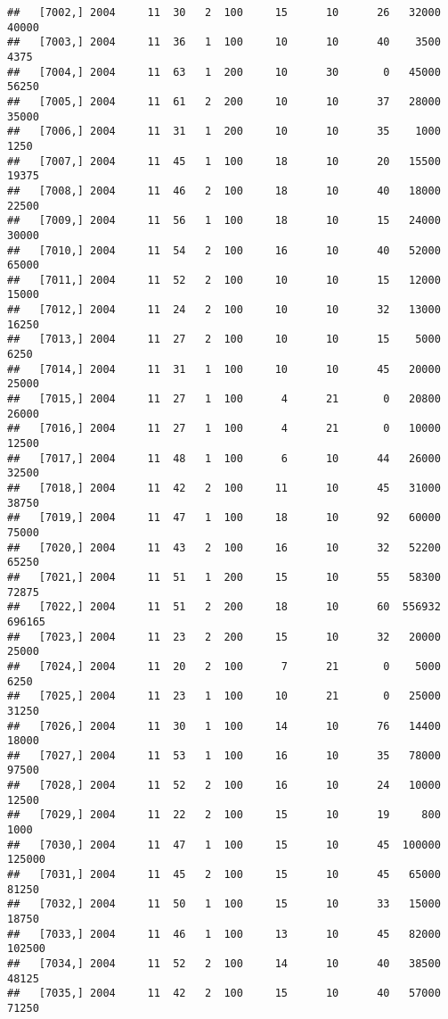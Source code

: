 \documentclass{article}\usepackage[]{graphicx}\usepackage[]{color}
\makeatletter
\newenvironment{kframe}{%
 \def\at@end@of@kframe{}%
 \ifinner\ifhmode%
  \def\at@end@of@kframe{\end{minipage}}%
  \begin{minipage}{\columnwidth}%
 \fi\fi%
 \def\FrameCommand##1{\hskip\@totalleftmargin \hskip-\fboxsep
 \colorbox{shadecolor}{##1}\hskip-\fboxsep
     \hskip-\linewidth \hskip-\@totalleftmargin \hskip\columnwidth}%
 \MakeFramed {\advance\hsize-\width
   \@totalleftmargin\z@ \linewidth\hsize
   \@setminipage}}%
 {\par\unskip\endMakeFramed%
 \at@end@of@kframe}
\newenvironment{knitrout}{}{} %
\makeatother
\begin{document}
\begin{knitrout}
\begin{kframe}
\begin{verbatim}
##   [7002,] 2004     11  30   2  100     15      10      26   32000   40000
##   [7003,] 2004     11  36   1  100     10      10      40    3500    4375
##   [7004,] 2004     11  63   1  200     10      30       0   45000   56250
##   [7005,] 2004     11  61   2  200     10      10      37   28000   35000
##   [7006,] 2004     11  31   1  200     10      10      35    1000    1250
##   [7007,] 2004     11  45   1  100     18      10      20   15500   19375
##   [7008,] 2004     11  46   2  100     18      10      40   18000   22500
##   [7009,] 2004     11  56   1  100     18      10      15   24000   30000
##   [7010,] 2004     11  54   2  100     16      10      40   52000   65000
##   [7011,] 2004     11  52   2  100     10      10      15   12000   15000
##   [7012,] 2004     11  24   2  100     10      10      32   13000   16250
##   [7013,] 2004     11  27   2  100     10      10      15    5000    6250
##   [7014,] 2004     11  31   1  100     10      10      45   20000   25000
##   [7015,] 2004     11  27   1  100      4      21       0   20800   26000
##   [7016,] 2004     11  27   1  100      4      21       0   10000   12500
##   [7017,] 2004     11  48   1  100      6      10      44   26000   32500
##   [7018,] 2004     11  42   2  100     11      10      45   31000   38750
##   [7019,] 2004     11  47   1  100     18      10      92   60000   75000
##   [7020,] 2004     11  43   2  100     16      10      32   52200   65250
##   [7021,] 2004     11  51   1  200     15      10      55   58300   72875
##   [7022,] 2004     11  51   2  200     18      10      60  556932  696165
##   [7023,] 2004     11  23   2  200     15      10      32   20000   25000
##   [7024,] 2004     11  20   2  100      7      21       0    5000    6250
##   [7025,] 2004     11  23   1  100     10      21       0   25000   31250
##   [7026,] 2004     11  30   1  100     14      10      76   14400   18000
##   [7027,] 2004     11  53   1  100     16      10      35   78000   97500
##   [7028,] 2004     11  52   2  100     16      10      24   10000   12500
##   [7029,] 2004     11  22   2  100     15      10      19     800    1000
##   [7030,] 2004     11  47   1  100     15      10      45  100000  125000
##   [7031,] 2004     11  45   2  100     15      10      45   65000   81250
##   [7032,] 2004     11  50   1  100     15      10      33   15000   18750
##   [7033,] 2004     11  46   1  100     13      10      45   82000  102500
##   [7034,] 2004     11  52   2  100     14      10      40   38500   48125
##   [7035,] 2004     11  42   2  100     15      10      40   57000   71250

\end{verbatim}
\end{kframe}
\end{knitrout}
\end{document}

